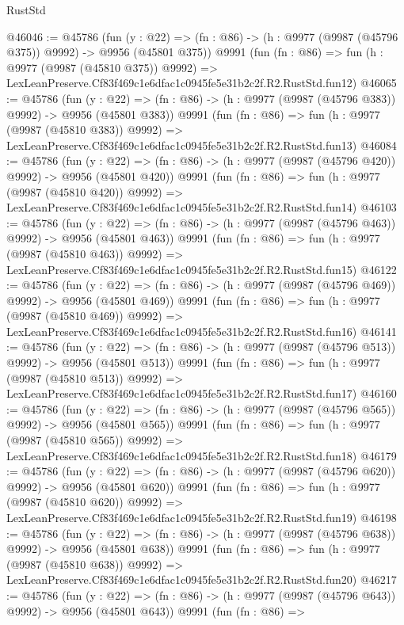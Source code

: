 \begin{lexlean}{RustStd}
\begin{coremodule}
@46046 := @45786
    (fun (y : @22) => (fn : @86) -> (h : @9977 (@9987 (@45796 @375)) @9992) -> @9956 (@45801 @375))
    @9991
    (fun (fn : @86) =>
    fun (h : @9977 (@9987 (@45810 @375)) @9992) =>
    LexLeanPreserve.Cf83f469c1e6dfac1c0945fe5e31b2c2f.R2.RustStd.fun12)
@46065 := @45786
    (fun (y : @22) => (fn : @86) -> (h : @9977 (@9987 (@45796 @383)) @9992) -> @9956 (@45801 @383))
    @9991
    (fun (fn : @86) =>
    fun (h : @9977 (@9987 (@45810 @383)) @9992) =>
    LexLeanPreserve.Cf83f469c1e6dfac1c0945fe5e31b2c2f.R2.RustStd.fun13)
@46084 := @45786
    (fun (y : @22) => (fn : @86) -> (h : @9977 (@9987 (@45796 @420)) @9992) -> @9956 (@45801 @420))
    @9991
    (fun (fn : @86) =>
    fun (h : @9977 (@9987 (@45810 @420)) @9992) =>
    LexLeanPreserve.Cf83f469c1e6dfac1c0945fe5e31b2c2f.R2.RustStd.fun14)
@46103 := @45786
    (fun (y : @22) => (fn : @86) -> (h : @9977 (@9987 (@45796 @463)) @9992) -> @9956 (@45801 @463))
    @9991
    (fun (fn : @86) =>
    fun (h : @9977 (@9987 (@45810 @463)) @9992) =>
    LexLeanPreserve.Cf83f469c1e6dfac1c0945fe5e31b2c2f.R2.RustStd.fun15)
@46122 := @45786
    (fun (y : @22) => (fn : @86) -> (h : @9977 (@9987 (@45796 @469)) @9992) -> @9956 (@45801 @469))
    @9991
    (fun (fn : @86) =>
    fun (h : @9977 (@9987 (@45810 @469)) @9992) =>
    LexLeanPreserve.Cf83f469c1e6dfac1c0945fe5e31b2c2f.R2.RustStd.fun16)
@46141 := @45786
    (fun (y : @22) => (fn : @86) -> (h : @9977 (@9987 (@45796 @513)) @9992) -> @9956 (@45801 @513))
    @9991
    (fun (fn : @86) =>
    fun (h : @9977 (@9987 (@45810 @513)) @9992) =>
    LexLeanPreserve.Cf83f469c1e6dfac1c0945fe5e31b2c2f.R2.RustStd.fun17)
@46160 := @45786
    (fun (y : @22) => (fn : @86) -> (h : @9977 (@9987 (@45796 @565)) @9992) -> @9956 (@45801 @565))
    @9991
    (fun (fn : @86) =>
    fun (h : @9977 (@9987 (@45810 @565)) @9992) =>
    LexLeanPreserve.Cf83f469c1e6dfac1c0945fe5e31b2c2f.R2.RustStd.fun18)
@46179 := @45786
    (fun (y : @22) => (fn : @86) -> (h : @9977 (@9987 (@45796 @620)) @9992) -> @9956 (@45801 @620))
    @9991
    (fun (fn : @86) =>
    fun (h : @9977 (@9987 (@45810 @620)) @9992) =>
    LexLeanPreserve.Cf83f469c1e6dfac1c0945fe5e31b2c2f.R2.RustStd.fun19)
@46198 := @45786
    (fun (y : @22) => (fn : @86) -> (h : @9977 (@9987 (@45796 @638)) @9992) -> @9956 (@45801 @638))
    @9991
    (fun (fn : @86) =>
    fun (h : @9977 (@9987 (@45810 @638)) @9992) =>
    LexLeanPreserve.Cf83f469c1e6dfac1c0945fe5e31b2c2f.R2.RustStd.fun20)
@46217 := @45786
    (fun (y : @22) => (fn : @86) -> (h : @9977 (@9987 (@45796 @643)) @9992) -> @9956 (@45801 @643))
    @9991
    (fun (fn : @86) =>

\end{coremodule}
\end{lexlean}
